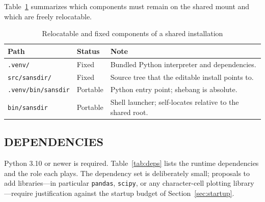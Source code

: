 \documentclass[tm]{ornltm}
\begin{document}
Table~\ref{tab:portable} summarizes which components must remain on the shared
mount and which are freely relocatable.

\begin{table}[ht]
  \centering
  \caption{Relocatable and fixed components of a shared installation}
  \label{tab:portable}
  \small
  \begin{tabular}{p{} p{} p{}}
    \toprule
    Path & Status & Note \\
    \midrule
    \texttt{.venv/} & Fixed & Bundled Python interpreter and dependencies. \\
    \texttt{src/sansdir/} & Fixed & Source tree that the editable install
      points to. \\
    \texttt{.venv/bin/sansdir} & Portable & Python entry point; shebang is
      absolute. \\
    \texttt{bin/sansdir} & Portable & Shell launcher; self-locates relative to
      the shared root. \\
    \bottomrule
  \end{tabular}
\end{table}

\subsection{DEPENDENCIES}

Python 3.10 or newer is required. Table~\ref{tab:deps} lists the runtime
dependencies and the role each plays. The dependency set is deliberately small;
proposals to add libraries---in particular \texttt{pandas}, \texttt{scipy}, or
any character-cell plotting library---require justification against the startup
budget of Section~\ref{sec:startup}.
\end{document}
